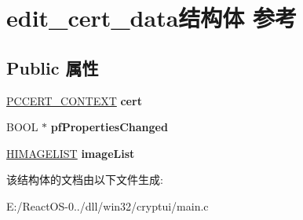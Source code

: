 \hypertarget{structedit__cert__data}{}\section{edit\+\_\+cert\+\_\+data结构体 参考}
\label{structedit__cert__data}
\subsection*{Public 属性}
\begin{DoxyCompactItemize}
\item 
\mbox{\label{structedit__cert__data_abb51b0575691259019da2eae9d4cc042}} 
\hyperlink{struct___c_e_r_t___c_o_n_t_e_x_t}{P\+C\+C\+E\+R\+T\+\_\+\+C\+O\+N\+T\+E\+XT} {\bfseries cert}
\item 
\mbox{\label{structedit__cert__data_a4988dd276487560da55499da3378d66c}} 
B\+O\+OL $\ast$ {\bfseries pf\+Properties\+Changed}
\item 
\mbox{\label{structedit__cert__data_a115d6dbd1060b9259aedc6962cb966db}} 
\hyperlink{struct___i_m_a_g_e_l_i_s_t}{H\+I\+M\+A\+G\+E\+L\+I\+ST} {\bfseries image\+List}
\end{DoxyCompactItemize}


该结构体的文档由以下文件生成\+:\begin{DoxyCompactItemize}
\item 
E\+:/\+React\+O\+S-\/0../dll/win32/cryptui/main.\+c\end{DoxyCompactItemize}
